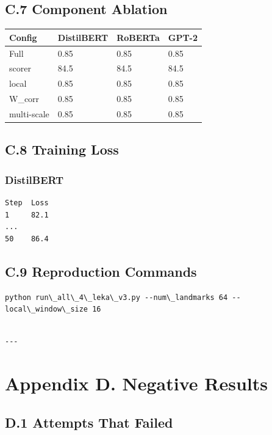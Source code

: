 \subsection{C.7 Component Ablation}

\begin{table}[H]
\centering
\small
\begin{tabular}{llll}
\toprule
\textbf{Config} & \textbf{DistilBERT} & \textbf{RoBERTa} & \textbf{GPT-2} \\
\midrule
Full & 0.85 & 0.85 & 0.85 \\
scorer & 84.5 & 84.5 & 84.5 \\
local & 0.85 & 0.85 & 0.85 \\
W\_corr & 0.85 & 0.85 & 0.85 \\
multi-scale & 0.85 & 0.85 & 0.85 \\
\bottomrule
\end{tabular}
\end{table}

\subsection{C.8 Training Loss}

\subsubsection{DistilBERT}
\begin{lstlisting}
Step  Loss
1     82.1
...
50    86.4
\end{lstlisting}

\subsection{C.9 Reproduction Commands}

\begin{lstlisting}
python run\_all\_4\_leka\_v3.py --num\_landmarks 64 --local\_window\_size 16
\end{lstlisting}
\begin{lstlisting}

---
\end{lstlisting}

\section{Appendix D. Negative Results}

\subsection{D.1 Attempts That Failed}

